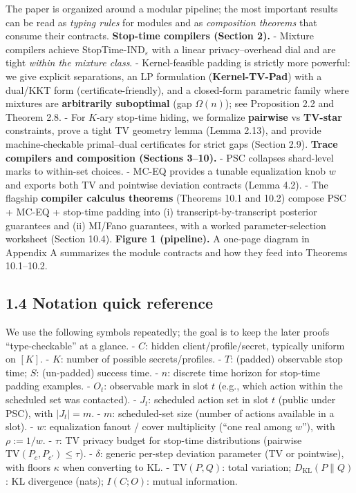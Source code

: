 \documentclass[11pt]{article}
\begin{document}
The paper is organized around a modular pipeline; the most important
results can be read as \emph{typing rules} for modules and as
\emph{composition theorems} that consume their contracts.
\textbf{Stop-time compilers (Section 2).} - Mixture compilers achieve
StopTime-IND\(_\varepsilon\) with a linear privacy--overhead dial and
are tight \emph{within the mixture class}. - Kernel-feasible padding is
strictly more powerful: we give explicit separations, an LP formulation
(\textbf{Kernel-TV-Pad}) with a dual/KKT form (certificate-friendly),
and a closed-form parametric family where mixtures are
\textbf{arbitrarily suboptimal} (gap \(\Omega(n)\)); see Proposition 2.2
and Theorem 2.8. - For \(K\)-ary stop-time hiding, we formalize
\textbf{pairwise} vs \textbf{TV-star} constraints, prove a tight TV
geometry lemma (Lemma 2.13), and provide machine-checkable primal--dual
certificates for strict gaps (Section 2.9). \textbf{Trace compilers and
composition (Sections 3--10).} - PSC collapses shard-level marks to
within-set choices. - MC-EQ provides a tunable equalization knob \(w\)
and exports both TV and pointwise deviation contracts (Lemma 4.2). - The
flagship \textbf{compiler calculus theorems} (Theorems 10.1 and 10.2)
compose PSC + MC-EQ + stop-time padding into (i)
transcript-by-transcript posterior guarantees and (ii) MI/Fano
guarantees, with a worked parameter-selection worksheet (Section 10.4).
\textbf{Figure 1 (pipeline).} A one-page diagram in Appendix A
summarizes the module contracts and how they feed into Theorems
10.1--10.2.

\hypertarget{notation-quick-reference}{%
\subsection{1.4 Notation quick
reference}\label{notation-quick-reference}}

We use the following symbols repeatedly; the goal is to keep the later
proofs ``type-checkable'' at a glance. - \(C\): hidden
client/profile/secret, typically uniform on \([K]\). - \(K\): number of
possible secrets/profiles. - \(T\): (padded) observable stop time;
\(S\): (un-padded) success time. - \(n\): discrete time horizon for
stop-time padding examples. - \(O_t\): observable mark in slot \(t\)
(e.g., which action within the scheduled set was contacted). - \(J_t\):
scheduled action set in slot \(t\) (public under PSC), with \(|J_t|=m\).
- \(m\): scheduled-set size (number of actions available in a slot). -
\(w\): equalization fanout / cover multiplicity (``one real among
\(w\)''), with \(\rho:= 1/w\). - \(\tau\): TV privacy budget for
stop-time distributions (pairwise \(\mathrm{TV}(P_c,P_{c'})\le \tau\)).
- \(\delta\): generic per-step deviation parameter (TV or pointwise),
with floors \(\kappa\) when converting to KL. - \(\mathrm{TV}(P,Q)\):
total variation; \(D_{\mathrm{KL}}(P\|Q)\): KL divergence (nats);
\(I(C;O)\): mutual information.
\end{document}
